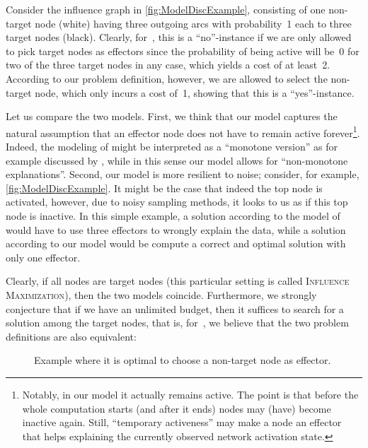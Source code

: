 \documentclass{article}
\begin{document}
Consider the influence graph in \autoref{fig:ModelDiscExample},
consisting of one non-target node (white) having three outgoing arcs
with probability~1 each to three target nodes (black).
Clearly, for~, this is a ``no''-instance if we are
only allowed to pick target nodes as effectors since
the probability of being active will be~0 for two of the three target
nodes in any case, which yields a cost of at least~2.
According to our problem definition, however, we are allowed to select the
non-target node, which only incurs a cost of~1, showing that this
is a ``yes''-instance.

Let us compare the two models.
First,
we think that our model captures the natural assumption that
an effector node does not have to remain active forever\footnote{Notably, in our model it actually remains active. The point is that before the whole computation starts (and after it ends) nodes may (have) become inactive again. Still, ``temporary activeness'' may make a node an effector that helps
explaining the currently observed network activation state.}.
Indeed, the modeling of \citet{LTGMH10} might be interpreted as a
``monotone version'' as for example discussed by \citet{ABS14}, 
while in this sense our model allows for ``non-monotone explanations''.
Second,
our model is more resilient to noise;
consider, for example, \autoref{fig:ModelDiscExample}.
It might be the case that indeed the top node is activated,
however,
due to noisy sampling methods,
it looks to us as if this top node is inactive.
In this simple example,
a solution according to the model of \citet{LTGMH10} would have to use three effectors to wrongly explain the data,
while a solution according to our model would be compute a correct and optimal solution with only one effector.


Clearly, if all nodes are target nodes (this particular setting is called \textsc{Influence Maximization}), 
then the two models coincide. 
Furthermore, we strongly conjecture that if we have an unlimited budget,
then it suffices to search for a solution
among the target nodes, that is, for~, we believe that the two
problem definitions are also equivalent:

\begin{SCfigure}[2.3][t]
  \centering
  \label{fig:ModelDiscExample}
  \caption{Example where it is optimal to choose a non-target node as effector.}
\end{SCfigure}
\end{document}

